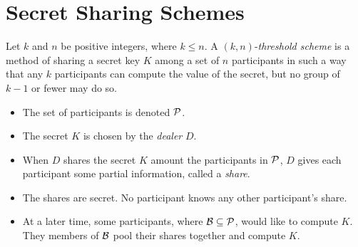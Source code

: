 \section{Secret Sharing Schemes}\label{sec:Secret_Sharing_Schemes}
\begin{definition}\label{def:Threshold_Scheme}
  Let $k$ and $n$ be positive integers, where $k \leq n$.
  A $(k, n)$-\emph{threshold scheme} is a method of sharing a secret key $K$ among a set of $n$ participants in such a way that any $k$ participants can compute the value of the secret, but no group of $k-1$ or fewer may do so.

  \begin{itemize}[noitemsep]
  \item The set of participants is denoted $\operatorname{\mathcal{P}}$.
  \item The secret $K$ is chosen by the \emph{dealer} $D$.
  \item When $D$ shares the secret $K$ amount the participants in $\operatorname{\mathcal{P}}$, $D$ gives each participant some partial information, called a \emph{share}.
  \item The shares are secret. No participant knows any other participant's share.
  \item At a later time, some participants, where $\operatorname{\mathcal{B}} \subseteq \operatorname{\mathcal{P}}$, would like to compute $K$. They members of $\operatorname{\mathcal{B}}$ pool their shares together and compute $K$.
  \end{itemize}
\end{definition}

